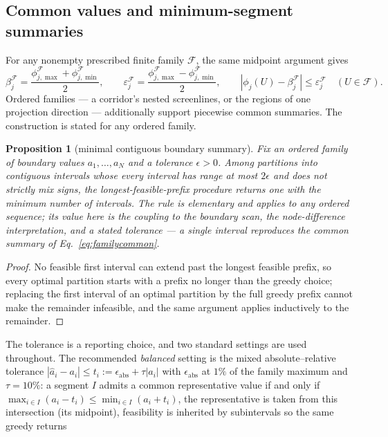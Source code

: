 \documentclass[a4paper,fleqn]{cas-sc}
\newtheorem{proposition}[theorem]{Proposition}
\begin{document}
\subsection{Common values and minimum-segment summaries}\label{sec:segments}
For any nonempty prescribed finite family $\mathcal F$, the same midpoint argument gives
\begin{equation}
\beta_j^{\mathcal F}=\frac{\phi_{j,\max}^{\mathcal F}+\phi_{j,\min}^{\mathcal F}}2,
\qquad \varepsilon_j^{\mathcal F}=\frac{\phi_{j,\max}^{\mathcal F}-\phi_{j,\min}^{\mathcal F}}2,
\qquad |\phi_j(U)-\beta_j^{\mathcal F}|\le\varepsilon_j^{\mathcal F}\quad(U\in\mathcal F).
\label{eq:familycommon}
\end{equation}
Ordered families --- a corridor's nested screenlines, or the regions of
one projection direction --- additionally support piecewise common
summaries. The construction is stated for any ordered family.
\begin{proposition}[minimal contiguous boundary summary]\label{prop:segmented}
Fix an ordered family of boundary values $a_1,\ldots,a_N$ and a
tolerance $\epsilon>0$. Among partitions into contiguous intervals
whose every interval has range at most $2\epsilon$ and does not
strictly mix signs, the longest-feasible-prefix procedure returns one
with the minimum number of intervals. The rule is elementary and
applies to any ordered sequence; its value here is the coupling to the
boundary scan, the node-difference interpretation, and a stated
tolerance --- a single interval reproduces the common summary of
Eq.~\eqref{eq:familycommon}.
\end{proposition}
\begin{proof}
No feasible first interval can extend past the longest feasible prefix,
so every optimal partition starts with a prefix no longer than the
greedy choice; replacing the first interval of an optimal partition by
the full greedy prefix cannot make the remainder infeasible, and the
same argument applies inductively to the remainder.
\end{proof}
The tolerance is a reporting choice, and two standard settings are
used throughout. The recommended \emph{balanced} setting is the mixed
absolute--relative tolerance
$|\hat a_i-a_i|\le t_i:=\epsilon_{\mathrm{abs}}+\tau|a_i|$ with
$\epsilon_{\mathrm{abs}}$ at $1\%$ of the family maximum and
$\tau=10\%$: a segment $I$ admits a common representative value if and
only if $\max_{i\in I}(a_i-t_i)\le\min_{i\in I}(a_i+t_i)$, the
representative is taken from this intersection (its midpoint),
feasibility is inherited by subintervals so the same greedy returns
\end{document}
